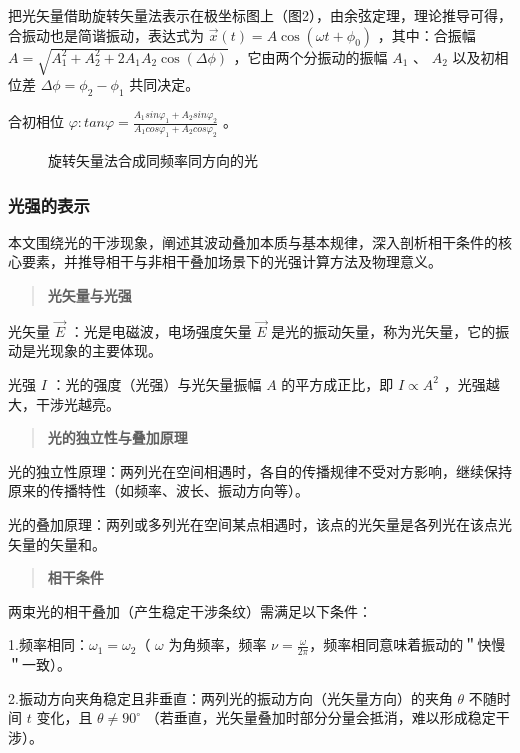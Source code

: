 \documentclass[withoutpreface,bwprint]{cumcmthesis} %
\begin{document}
把光矢量借助旋转矢量法表示在极坐标图上（图2），由余弦定理，理论推导可得，合振动也是简谐振动，表达式为 $\overrightarrow{x}(t) = A \cos(\omega t + \phi_0)$ ，其中：合振幅 $A = \sqrt{A_1^2 + A_2^2 + 2 A_1 A_2 \cos(\Delta \phi)}$ ，它由两个分振动的振幅 $A_1$ 、 $A_2$ 以及初相位差 $\Delta \phi = \phi_{2} - \phi_{1}$ 共同决定。

合初相位 \(\varphi:tan\varphi = \frac{A_{1}sin\varphi_{1} + A_{2}sin\varphi_{2}}{A_{1}cos\varphi_{1} + A_{2}cos\varphi_{2}}\) 。

\begin{figure}[ht]
    \centering
    \fbox{\rule{2cm}{0pt} \rule{0pt}{2cm}} %
    \caption{旋转矢量法合成同频率同方向的光}
    \label{fig:2}
\end{figure}

\subsubsection{光强的表示}
本文围绕光的干涉现象，阐述其波动叠加本质与基本规律，深入剖析相干条件的核心要素，并推导相干与非相干叠加场景下的光强计算方法及物理意义。


\begin{quote}
    \textbf{光矢量与光强}
\end{quote}

光矢量 $\vec{E}$ ：光是电磁波，电场强度矢量 $\vec{E}$ 是光的振动矢量，称为光矢量，它的振动是光现象的主要体现。

光强 $I$ ：光的强度（光强）与光矢量振幅 $A$ 的平方成正比，即 $I \propto A^2$ ，光强越大，干涉光越亮。

\begin{quote}
    \textbf{光的独立性与叠加原理}
\end{quote}


光的独立性原理：两列光在空间相遇时，各自的传播规律不受对方影响，继续保持原来的传播特性（如频率、波长、振动方向等）。

光的叠加原理：两列或多列光在空间某点相遇时，该点的光矢量是各列光在该点光矢量的矢量和。


\begin{quote}
    \textbf{相干条件}
\end{quote}
两束光的相干叠加（产生稳定干涉条纹）需满足以下条件：

1.频率相同：\(\omega_{1} = \omega_{2}\)（ $\omega$ 为角频率，频率 $\nu= \frac{\omega}{2\pi}$，频率相同意味着振动的＂快慢＂一致）。

2.振动方向夹角稳定且非垂直：两列光的振动方向（光矢量方向）的夹角 $\theta$ 不随时间 $t$ 变化，且 $\theta \neq 90^\circ$ （若垂直，光矢量叠加时部分分量会抵消，难以形成稳定干涉）。
\end{document}
